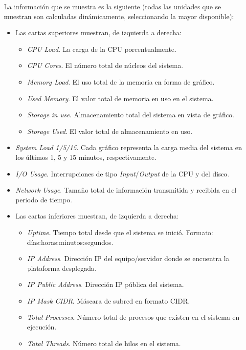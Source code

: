 La información que se muestra es la siguiente (todas las unidades que se muestran son calculadas dinámicamente, seleccionando la mayor disponible):
\begin{itemize}
\item Las cartas superiores muestran, de izquierda a derecha:
\begin{itemize}
	\item \textit{CPU Load}. La carga de la CPU porcentualmente.
	\item \textit{CPU Cores}. El número total de núcleos del sistema.
	\item \textit{Memory Load}. El uso total de la memoria en forma de gráfico.
	\item \textit{Used Memory}. El valor total de memoria en uso en el sistema.
	\item \textit{Storage in use}. Almacenamiento total del sistema en vista de gráfico.
	\item \textit{Storage Used}. El valor total de almacenamiento en uso.
\end{itemize}
\item \textit{System Load 1/5/15}. Cada gráfico representa la carga media del sistema en los últimos 1, 5 y 15 minutos, respectivamente.
\item \textit{I/O Usage}. Interrupciones de tipo \textit{Input}/\textit{Output} de la CPU y del disco.
\item \textit{Network Usage}. Tamaño total de información transmitida y recibida en el periodo de tiempo.
\item Las cartas inferiores muestran, de izquierda a derecha:
\begin{itemize}
	\item \textit{Uptime}. Tiempo total desde que el sistema se inició. Formato: días:horas:minutos:segundos.
	\item \textit{IP Address}. Dirección IP del equipo/servidor donde se encuentra la plataforma desplegada.
	\item \textit{IP Public Address}. Dirección IP pública del sistema.
	\item \textit{IP Mask CIDR}. Máscara de subred en formato CIDR.
	\item \textit{Total Processes}. Número total de procesos que existen en el sistema en ejecución.
	\item \textit{Total Threads}. Número total de hilos en el sistema.
\end{itemize}
\end{itemize}

